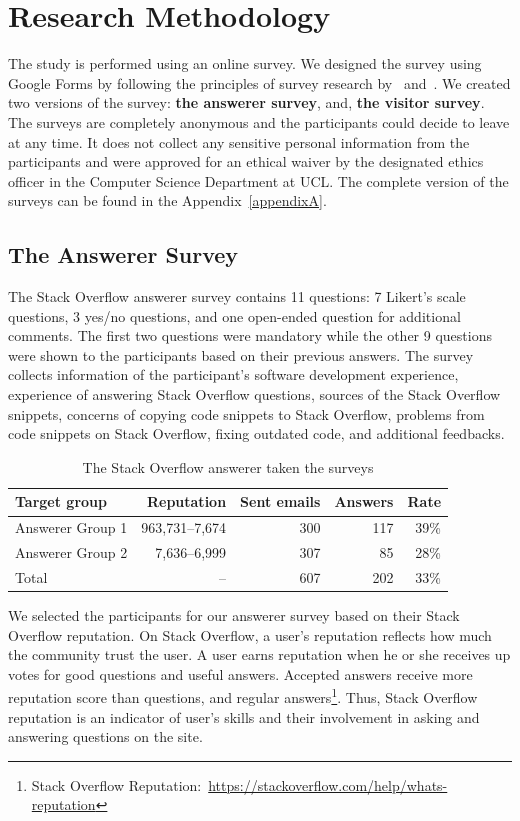\documentclass{svjour3}                     %
\begin{document}
\section{Research Methodology}
The study is performed using an online survey. We designed the survey using
Google Forms by following the principles of survey research
by~\cite{Pfleeger2001} and~\cite{Kitchenham2002}. 
We created two versions of the
survey: \textbf{the answerer survey}, and, \textbf{the visitor survey}. 
The surveys are completely anonymous and the participants could decide to leave at
any time. It does not collect any sensitive personal information from the
participants and were approved for an ethical waiver by the designated ethics
officer in the Computer Science Department at UCL.  The complete version of
the surveys can be found in the Appendix~\ref{appendixA}.


\subsection{The Answerer Survey}
The Stack Overflow answerer survey contains 11 questions: 7 Likert's scale
questions, 3 yes/no questions, and one open-ended question for additional
comments. The first two questions were mandatory while the other 9 questions
were shown to the participants based on their previous answers. The survey collects
information of the participant's software development experience, experience of
answering Stack Overflow questions, sources of the Stack Overflow snippets,
concerns of copying code snippets to Stack Overflow, problems from code 
snippets on Stack Overflow, fixing outdated code, and additional feedbacks.

\begin{table}
	\centering
	\caption{The Stack Overflow answerer taken the surveys}
	\label{tab:answerers}
	\begin{tabular}{lrrrr}
		\toprule
		Target group & Reputation & Sent emails & Answers & Rate \\
		\midrule
		Answerer Group 1 & 963,731--7,674 & 300 & 117 & 39\% \\
		Answerer Group 2 & 7,636--6,999 & 307 & 85 & 28\% \\
		\midrule
		Total & -- & 607 & 202 & 33\% \\
		\bottomrule
	\end{tabular}
\end{table}

We selected the participants for our answerer survey based on their Stack Overflow reputation. On
Stack Overflow, a user's reputation reflects how much the community trust the
user. A user earns reputation when he or she receives up votes for good
questions and useful answers. Accepted answers receive more reputation score
than questions, and regular answers\footnote{Stack Overflow
	Reputation:~\url{https://stackoverflow.com/help/whats-reputation}}. Thus, Stack
Overflow reputation is an indicator of user's skills and their involvement in
asking and answering questions on the site.
\end{document}
